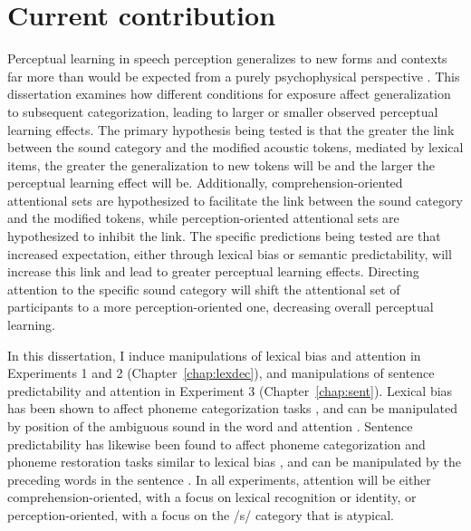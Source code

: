 \section{Current contribution}

Perceptual learning in speech perception generalizes to new forms and contexts far more than would be expected from a purely psychophysical perspective \citep{Norris2003,Gilbert2001}.
This dissertation examines how different conditions for exposure affect generalization to subsequent categorization, leading to larger or smaller observed perceptual learning effects.
The primary hypothesis being tested is that the greater the link between the sound category and the modified acoustic tokens, mediated by lexical items, the greater the generalization to new tokens will be and the larger the perceptual learning effect will be.
Additionally, comprehension-oriented attentional sets are hypothesized to facilitate the link between the sound category and the modified tokens, while perception-oriented attentional sets are hypothesized to inhibit the link.
The specific predictions being tested are that increased expectation, either through lexical bias or semantic predictability, will increase this link and lead to greater perceptual learning effects.  
Directing attention to the specific sound category will shift the attentional set of participants to a more perception-oriented one, decreasing overall perceptual learning. 

In this dissertation,  I induce manipulations of lexical bias and attention in Experiments 1 and 2 (Chapter~\ref{chap:lexdec}), and manipulations of sentence predictability and attention in Experiment 3 (Chapter~\ref{chap:sent}). 
Lexical bias has been shown to affect phoneme categorization tasks \citep{Ganong1980}, and can be manipulated by position of the ambiguous sound in the word and attention \citep{Pitt2012}.  
Sentence predictability has likewise been found to affect phoneme categorization and phoneme restoration tasks similar to lexical bias \citep{Borsky1998, Samuel1981}, and can be manipulated by the preceding words in the sentence \citep{Kalikow1977}.  
In all experiments, attention will be either comprehension-oriented, with a focus on lexical recognition or identity, or perception-oriented, with a focus on the /s/ category that is atypical.
